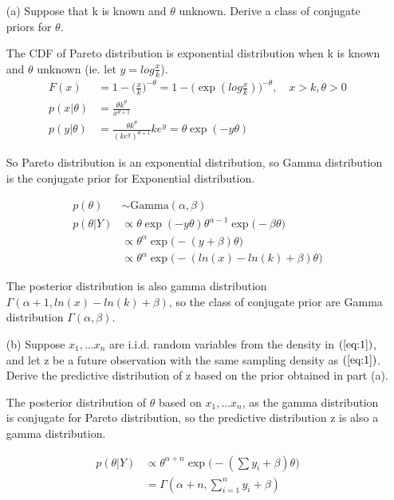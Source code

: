 \begin{itemize}
\item[(a)] Suppose that k is known and $\theta$ unknown. Derive a class of conjugate priors for $\theta$.

The CDF of Pareto distribution is exponential distribution when k is known and $\theta$ unknown (ie. let $y = log \frac{x}{k}$).
\begin{align*}
   F(x) &= 1 - \Big(\frac{x}{k} \Big)^{-\theta} = 1 - \Big( \exp (log \frac{x}{k}) \Big)^{-\theta}, \quad x > k, \theta > 0 \\
   p(x | \theta) &= \frac{\theta k^{\theta}}{x^{\theta + 1}} \\
   p(y| \theta) &= \frac{\theta k^{\theta}}{(k e^y)^{\theta + 1}} k e^{y} = \theta \exp(-y \theta)
\end{align*}

So Pareto distribution is an exponential distribution, so Gamma distribution is the conjugate prior for Exponential distribution.

\begin{align*}
   p(\theta) & \sim \text{Gamma} (\alpha, \beta) \\
   p(\theta | Y) & \propto \theta \exp(-y \theta)  \theta^{\alpha - 1} \exp \Big( -\beta \theta \Big) \\
   & \propto \theta^{\alpha} \exp \Big(- (y+ \beta) \theta \Big) \\
   & \propto \theta^{\alpha} \exp \Big(- (ln(x) - ln(k) + \beta) \theta \Big) 
\end{align*}

The posterior distribution is also gamma distribution $\Gamma(\alpha + 1, ln(x) - ln(k) + \beta)$, so the class of conjugate prior are Gamma distribution $\Gamma (\alpha, \beta)$.

\item[(b)] Suppose $x_1,… x_n$ are i.i.d. random variables from the density in $(\ref{eq:1})$, and let z be a future observation with the same sampling density as $(\ref{eq:1})$. Derive the predictive
distribution of z based on the prior obtained in part (a).

The posterior distribution of $\theta$ based on $x_1,… x_n$, as the gamma distribution is conjugate for Pareto distribution, so the predictive distribution z is also a gamma distribution.

\begin{align*}
   p(\theta | Y) & \propto  \theta^{\alpha + n} \exp \Big(- (\sum y_i+ \beta) \theta \Big)  \\
   &= \Gamma (\alpha + n, \sum_{i=1}^n y_i+ \beta)
\end{align*}


\end{itemize}
